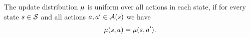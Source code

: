 \begin{definition}
\label{asp: unbiased over policies}
The update distribution $\mu$ is uniform over all actions in each state,
if
for every state $s \in \mathcal{S}$ and all actions $a, a' \in \mathcal{A}(s)$ we have
\begin{align}
    \nonumber
    \mu(s, a) = \mu(s, a') .
\end{align}
\end{definition}
